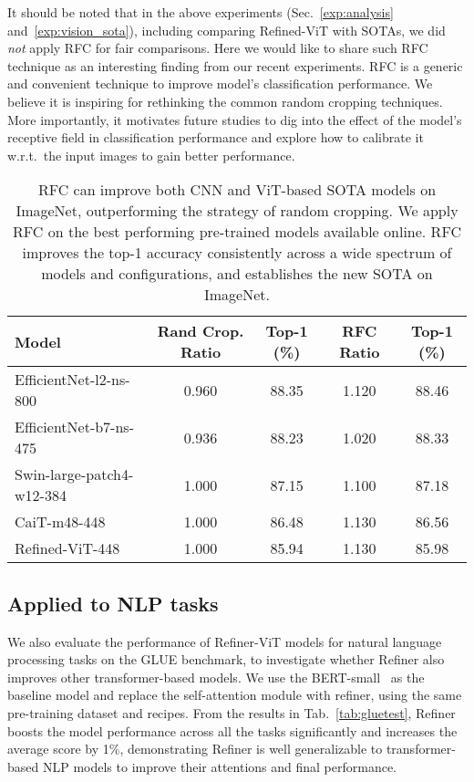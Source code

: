 It should be noted that in the above experiments (Sec.~\ref{exp:analysis} and~\ref{exp:vision_sota}), including comparing Refined-ViT with SOTAs,  we did \textit{not} apply   RFC   for fair comparisons. Here we would like to share such RFC technique as an interesting finding from our recent experiments. RFC is a generic and convenient technique to improve model's classification performance. We believe it is inspiring for rethinking the common random cropping techniques. More importantly, it motivates future studies to dig into the effect  of the model's receptive field   in  classification performance and explore how to calibrate it w.r.t.\ the input images to gain better performance. 

\begin{table*}[h]
\caption{\small RFC can improve both CNN and ViT-based SOTA models on ImageNet, outperforming the strategy of random cropping. We apply RFC on the best performing     pre-trained models   available online.   RFC improves the top-1 accuracy consistently across a wide spectrum of models and configurations, and  establishes  the new SOTA on ImageNet. }
\vspace{-2mm}
\label{tab:rfc}
\footnotesize
\begin{center}
\small
\begin{tabular}{l | c c  | c c  }
\toprule
 Model  & Rand Crop. Ratio &  Top-1 (\%)  & RFC Ratio & Top-1 (\%) \\ [0.5ex] 
\midrule
EfficientNet-l2-ns-800 \cite{tan2019efficientnet} & 0.960 & 88.35 & 1.120 & 88.46  \\ 
EfficientNet-b7-ns-475 \cite{tan2019efficientnet} & 0.936 & 88.23 & 1.020 & 88.33  \\ 
Swin-large-patch4-w12-384 \cite{liu2021swin}  & 1.000 & 87.15 & 1.100 & 87.18  \\ 
CaiT-m48-448 \cite{gong2021improve} & 1.000 & 86.48 & 1.130 & 86.56  \\ 
\midrule
Refined-ViT-448 & 1.000 & 85.94 & 1.130 & 85.98  \\
\bottomrule

\end{tabular}

\end{center}
\vspace{-2mm}
\end{table*}

\subsection{Applied  to NLP tasks}
We also evaluate the performance of Refiner-ViT models for natural language processing tasks on the GLUE benchmark, to investigate whether Refiner also improves other transformer-based models. We use the BERT-small~\cite{clark2020electra} as the baseline model and replace the self-attention module with refiner, using the same pre-training dataset and recipes. From the results in Tab.~\ref{tab:gluetest}, Refiner boosts the model performance across all the tasks significantly and increases the average score by 1\%, demonstrating Refiner is well generalizable to transformer-based NLP models to improve their attentions and final performance. 

